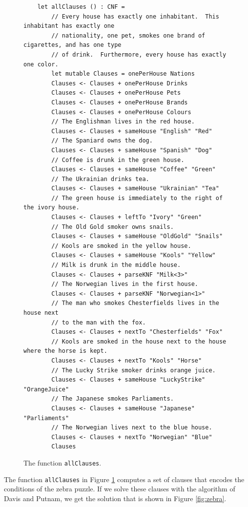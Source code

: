 \begin{figure}[!ht]
\centering
\begin{verbatim}
    let allClauses () : CNF =
        // Every house has exactly one inhabitant.  This inhabitant has exactly one
        // nationality, one pet, smokes one brand of cigarettes, and has one type
        // of drink.  Furthermore, every house has exactly one color.
        let mutable Clauses = onePerHouse Nations
        Clauses <- Clauses + onePerHouse Drinks
        Clauses <- Clauses + onePerHouse Pets
        Clauses <- Clauses + onePerHouse Brands
        Clauses <- Clauses + onePerHouse Colours
        // The Englishman lives in the red house.
        Clauses <- Clauses + sameHouse "English" "Red"
        // The Spaniard owns the dog.
        Clauses <- Clauses + sameHouse "Spanish" "Dog"
        // Coffee is drunk in the green house.
        Clauses <- Clauses + sameHouse "Coffee" "Green"
        // The Ukrainian drinks tea.
        Clauses <- Clauses + sameHouse "Ukrainian" "Tea"
        // The green house is immediately to the right of the ivory house.
        Clauses <- Clauses + leftTo "Ivory" "Green"
        // The Old Gold smoker owns snails.
        Clauses <- Clauses + sameHouse "OldGold" "Snails"
        // Kools are smoked in the yellow house.
        Clauses <- Clauses + sameHouse "Kools" "Yellow"
        // Milk is drunk in the middle house.
        Clauses <- Clauses + parseKNF "Milk<3>"
        // The Norwegian lives in the first house.
        Clauses <- Clauses + parseKNF "Norwegian<1>"
        // The man who smokes Chesterfields lives in the house next 
        // to the man with the fox.
        Clauses <- Clauses + nextTo "Chesterfields" "Fox"
        // Kools are smoked in the house next to the house where the horse is kept.
        Clauses <- Clauses + nextTo "Kools" "Horse"
        // The Lucky Strike smoker drinks orange juice.
        Clauses <- Clauses + sameHouse "LuckyStrike" "OrangeJuice"
        // The Japanese smokes Parliaments.
        Clauses <- Clauses + sameHouse "Japanese" "Parliaments"
        // The Norwegian lives next to the blue house.
        Clauses <- Clauses + nextTo "Norwegian" "Blue"
        Clauses
\end{verbatim}
\vspace*{-0.3cm}
\caption{The function \texttt{allClauses}.}
\label{fig:allClauses-zebra}
\end{figure}
The function \texttt{allClauses} in Figure \ref{fig:allClauses-zebra} computes a set of clauses that encodes the
conditions of the zebra puzzle.  If we solve these clauses with the algorithm of
Davis and Putnam, we get the solution that is shown in Figure \ref{fig:zebra}.

